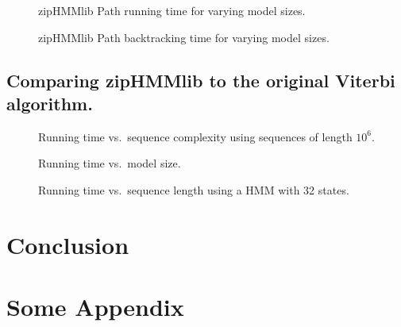 \documentclass[oneside,a4,danish,english,report]{memoir}
\begin{document}
\begin{figure}[H]
  \centering
  
  \caption{zipHMMlib Path running time for varying model sizes.}
  \label{fig:assymptotic_viterbi_path_k}
\end{figure}

\begin{figure}[H]
  \centering
  
  \caption{zipHMMlib Path backtracking time for varying model sizes.}
  \label{fig:assymptotic_viterbi_backtrack_k}
\end{figure}

\section{Comparing zipHMMlib to the original Viterbi algorithm.}
\label{sec:comp-ziphmml-orig}

\begin{figure}[H]
  \centering
  
  \caption{Running time vs.\ sequence complexity using sequences of length $10^6$.}
  \label{fig:speedup_vs_complexity}
\end{figure}

\begin{figure}[H]
  \centering
  
  \caption{Running time vs.\ model size.}
  \label{fig:speedup_vs_k}
\end{figure}

\begin{figure}[H]
  \centering
  
  \caption{Running time vs.\ sequence length using a HMM with 32 states.}
  \label{fig:speedup_vs_sequence_length}
\end{figure}

\chapter{Conclusion}
\label{cha:conclusion}

\appendix{}

\chapter{Some Appendix}
\label{cha:some-appendix}

\backmatter{}


\end{document}
